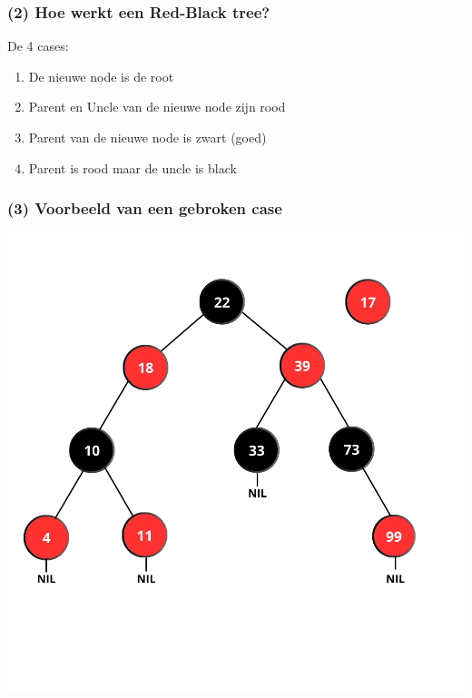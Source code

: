 \documentclass[aspectratio=169,sidebar,dyslexic]{uva-inf-presentation}
\begin{document}
\begin{frame}
\frametitle{(2) Hoe werkt een Red-Black tree?}
De 4 cases: \\
\begin{enumerate}
    \item De nieuwe node is de root
    \item Parent en Uncle van de nieuwe node zijn rood
    \item Parent van de nieuwe node is zwart (goed)
    \item Parent is rood maar de uncle is black
\end{enumerate}
\end{frame}

\begin{frame}
\frametitle{(3) Voorbeeld van een gebroken case}
    \includegraphics[scale=.30]{PRE-INSERTION.png}
\end{frame}
\end{document}
